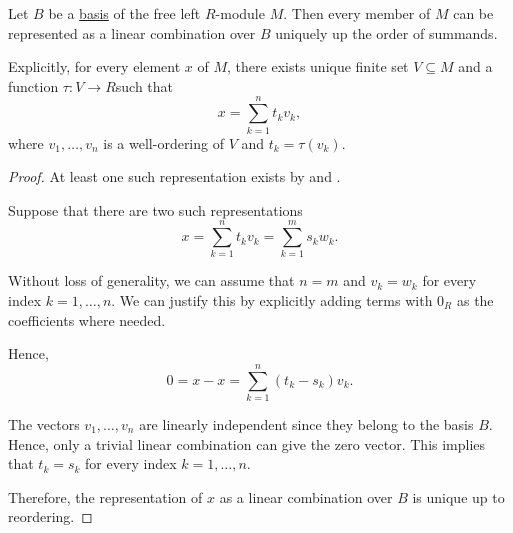 \begin{proposition}\label{thm:left_module_basis_decomposition}
  Let \( B \) be a \hyperref[def:module_linear_dependence]{basis} of the free left \( R \)-module \( M \). Then every member of \( M \) can be represented as a linear combination over \( B \) uniquely up the order of summands.

  Explicitly, for every element \( x \) of \( M \), there exists unique finite set \( V \subseteq M \) and a function \( \tau: V \to R \)such that
  \begin{equation*}
    x = \sum_{k=1}^n t_k v_k,
  \end{equation*}
  where \( v_1, \ldots, v_n \) is a well-ordering of \( V \) and \( t_k = \tau(v_k) \).
\end{proposition}
\begin{proof}
  At least one such representation exists by  and .

  Suppose that there are two such representations
  \begin{equation*}
    x = \sum_{k=1}^n t_k v_k = \sum_{k=1}^m s_k w_k.
  \end{equation*}

  Without loss of generality, we can assume that \( n = m \) and \( v_k = w_k \) for every index \( k = 1, \ldots, n \). We can justify this by explicitly adding terms with \( 0_R \) as the coefficients where needed.

  Hence,
  \begin{equation*}
    0 = x - x = \sum_{k=1}^n (t_k - s_k) v_k.
  \end{equation*}

  The vectors \( v_1, \ldots, v_n \) are linearly independent since they belong to the basis \( B \). Hence, only a trivial linear combination can give the zero vector. This implies that \( t_k = s_k \) for every index \( k = 1, \ldots, n \).

  Therefore, the representation of \( x \) as a linear combination over \( B \) is unique up to reordering.
\end{proof}

